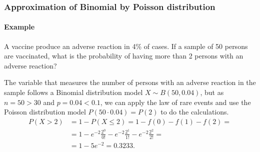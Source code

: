 \begin{frame}
\frametitle{Approximation of Binomial by Poisson distribution}
\framesubtitle{Example}
A vaccine produce an adverse reaction in 4\% of cases.
If a sample of 50 persons are vaccinated, what is the probability of having more than 2 persons with an adverse
reaction?

The variable that measures the number of persons with an adverse reaction in the sample follows a Binomial distribution
model $X\sim B(50,0.04)$, but as $n=50>30$ and $p=0.04<0.1$, we can apply the law of rare events and use the
Poisson distribution model $P(50\cdot 0.04)=P(2)$ to do the calculations. 
\begin{align*}
P(X>2) &= 1-P(X\leq 2) = 1-f(0)-f(1)-f(2) =\\
&= 1-e^{-2}\frac{2^0}{0!}-e^{-2}\frac{2^1}{1!}-e^{-2}\frac{2^2}{2!} =\\
&= 1-5e^{-2} = 0.3233.
\end{align*}
\end{frame}

